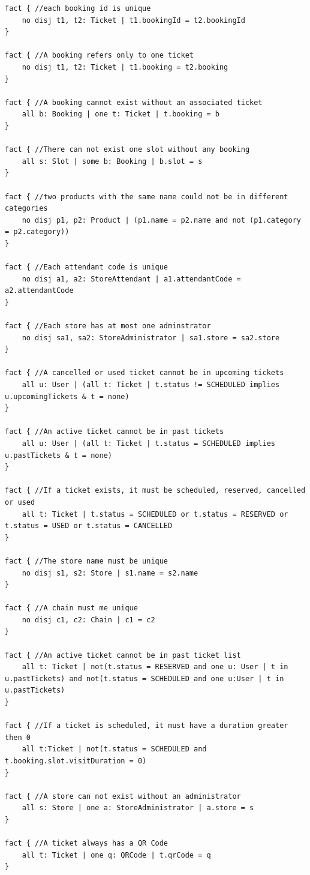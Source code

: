 \documentclass[table, 12pt]{article}
\begin{document}
\begin{lstlisting}[language=alloy]
fact { //each booking id is unique
	no disj t1, t2: Ticket | t1.bookingId = t2.bookingId
}

fact { //A booking refers only to one ticket
	no disj t1, t2: Ticket | t1.booking = t2.booking
}

fact { //A booking cannot exist without an associated ticket
	all b: Booking | one t: Ticket | t.booking = b
}

fact { //There can not exist one slot without any booking
	all s: Slot | some b: Booking | b.slot = s
}

fact { //two products with the same name could not be in different categories
	no disj p1, p2: Product | (p1.name = p2.name and not (p1.category = p2.category))
}

fact { //Each attendant code is unique
	no disj a1, a2: StoreAttendant | a1.attendantCode = a2.attendantCode
}

fact { //Each store has at most one adminstrator
	no disj sa1, sa2: StoreAdministrator | sa1.store = sa2.store
}

fact { //A cancelled or used ticket cannot be in upcoming tickets
	all u: User | (all t: Ticket | t.status != SCHEDULED implies u.upcomingTickets & t = none)
}

fact { //An active ticket cannot be in past tickets
	all u: User | (all t: Ticket | t.status = SCHEDULED implies u.pastTickets & t = none)
}

fact { //If a ticket exists, it must be scheduled, reserved, cancelled or used
	all t: Ticket | t.status = SCHEDULED or t.status = RESERVED or t.status = USED or t.status = CANCELLED
}

fact { //The store name must be unique
	no disj s1, s2: Store | s1.name = s2.name
}

fact { //A chain must me unique
	no disj c1, c2: Chain | c1 = c2
}

fact { //An active ticket cannot be in past ticket list
	all t: Ticket | not(t.status = RESERVED and one u: User | t in u.pastTickets) and not(t.status = SCHEDULED and one u:User | t in u.pastTickets)
}

fact { //If a ticket is scheduled, it must have a duration greater then 0
	all t:Ticket | not(t.status = SCHEDULED and t.booking.slot.visitDuration = 0)
}

fact { //A store can not exist without an administrator
	all s: Store | one a: StoreAdministrator | a.store = s
}

fact { //A ticket always has a QR Code
	all t: Ticket | one q: QRCode | t.qrCode = q
}


\end{lstlisting}
\end{document}
